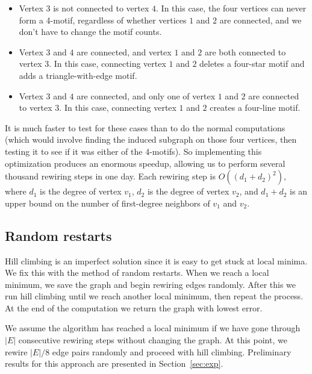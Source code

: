 \begin{itemize}
\item Vertex $3$ is not connected to vertex $4$.  In this case, the four vertices can never form a 4-motif, regardless of whether vertices $1$ and $2$ are connected, and we don't have to change the motif counts.
\item Vertex $3$ and $4$ are connected, and vertex $1$ and $2$ are both connected to vertex $3$.  In this case, connecting vertex $1$ and $2$ deletes a four-star motif and adds a triangle-with-edge motif.
\item Vertex $3$ and $4$ are connected, and only one of vertex $1$ and $2$ are connected to vertex $3$.  In this case, connecting vertex $1$ and $2$ creates a four-line motif.
\end{itemize}

It is much faster to test for these cases than to do the normal
computations (which would involve finding the induced subgraph on those
four vertices, then testing it to see if it was either of the 4-motifs).
So implementing this optimization produces an enormous speedup, allowing us
to perform several thousand rewiring steps in one day.  Each rewiring step
is $O((d_1 + d_2)^2)$, where $d_1$ is the degree of vertex $v_1$, $d_2$
is the degree of vertex $v_2$, and $d_1 + d_2$ is an upper bound on the 
number of first-degree neighbors of $v_1$ and $v_2$.

\subsection{Random restarts}

Hill climbing is an imperfect solution since it is easy to get stuck at
local minima.  We fix this with the method of random restarts.  When we
reach a local minimum, we save the graph and begin rewiring edges randomly.
After this we run hill climbing until we reach another local minimum, then 
repeat the process.  At the end of the computation we return the graph with
lowest error.

We assume the algorithm has reached a local minimum if we have gone through
$|E|$ consecutive rewiring steps without changing the graph.  At this
point, we rewire $|E|/8$ edge pairs randomly and proceed with hill
climbing.  Preliminary results for this approach are presented in 
Section~\ref{sec:exp}.

